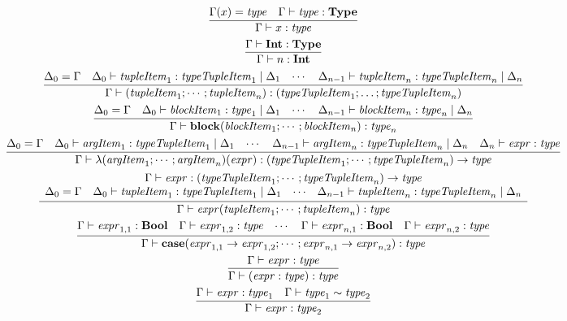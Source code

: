 \begin{gather*}
  \infer{\Gamma \vdash x: \mathit{type}}{
    \Gamma(x) = \mathit{type}
    &
    \Gamma \vdash \mathit{type}: \mathbf{Type}
  }
  \\
  \infer{\Gamma \vdash n: \mathbf{Int}}{
    \Gamma \vdash \mathbf{Int}: \mathbf{Type}
  }
  \\
  \infer{\Gamma \vdash (\mathit{tupleItem}_1; \cdots; \mathit{tupleItem}_n): (\mathit{typeTupleItem}_1; \ldots; \mathit{typeTupleItem}_n)}{
    \Delta_0 = \Gamma
    &
    \Delta_0 \vdash \mathit{tupleItem}_1: \mathit{typeTupleItem}_1 \mid \Delta_1
    &
    \cdots
    &
    \Delta_{n - 1} \vdash \mathit{tupleItem}_n: \mathit{typeTupleItem}_n \mid \Delta_n
  }
  \\
  \infer{\Gamma \vdash \mathbf{block}(\mathit{blockItem}_1; \cdots; \mathit{blockItem}_n): \mathit{type}_n}{
    \Delta_0 = \Gamma
    &
    \Delta_0 \vdash \mathit{blockItem}_1: \mathit{type}_1 \mid \Delta_1
    &
    \cdots
    &
    \Delta_{n - 1} \vdash \mathit{blockItem}_n: \mathit{type}_n \mid \Delta_n
  }
  \\
  \infer{\Gamma \vdash \lambda(\mathit{argItem}_1; \cdots; \mathit{argItem}_n)(\mathit{expr}): (\mathit{typeTupleItem}_1; \cdots; \mathit{typeTupleItem}_n) \rightarrow \mathit{type}}{
    \Delta_0 = \Gamma
    &
    \Delta_0 \vdash \mathit{argItem}_1: \mathit{typeTupleItem}_1 \mid \Delta_1
    &
    \cdots
    &
    \Delta_{n - 1} \vdash \mathit{argItem}_n: \mathit{typeTupleItem}_n \mid \Delta_n
    &
    \Delta_n \vdash \mathit{expr}: \mathit{type}
  }
  \\
  \infer{\Gamma \vdash \mathit{expr}(\mathit{tupleItem}_1; \cdots; \mathit{tupleItem}_n): \mathit{type}}{
    \begin{array}{cccc}
    \multicolumn{4}{c}{\Gamma \vdash \mathit{expr}: (\mathit{typeTupleItem}_1; \cdots; \mathit{typeTupleItem}_n) \rightarrow \mathit{type}}
    \\
    \Delta_0 = \Gamma
    &
    \Delta_0 \vdash \mathit{tupleItem}_1: \mathit{typeTupleItem}_1 \mid \Delta_1
    &
    \cdots
    &
    \Delta_{n - 1} \vdash \mathit{tupleItem}_n: \mathit{typeTupleItem}_n \mid \Delta_n
    \end{array}
  }
  \\
  \infer{\Gamma \vdash \mathbf{case}(\mathit{expr}_{1,1} \rightarrow \mathit{expr}_{1,2}; \cdots; \mathit{expr}_{n,1} \rightarrow \mathit{expr}_{n,2}): \mathit{type}}{
    \Gamma \vdash \mathit{expr}_{1, 1}: \mathbf{Bool}
    &
    \Gamma \vdash \mathit{expr}_{1, 2}: \mathit{type}
    &
    \cdots
    &
    \Gamma \vdash \mathit{expr}_{n, 1}: \mathbf{Bool}
    &
    \Gamma \vdash \mathit{expr}_{n, 2}: \mathit{type}
  }
  \\
  \infer{\Gamma \vdash (\mathit{expr}: \mathit{type}): \mathit{type}}{
    \Gamma \vdash \mathit{expr}: \mathit{type}
  }
  \\
  \infer{\Gamma \vdash \mathit{expr}: \mathit{type}_2}{
    \Gamma \vdash \mathit{expr}: \mathit{type}_1
    &
    \Gamma \vdash \mathit{type}_1 \sim \mathit{type}_2
  }
\end{gather*}

